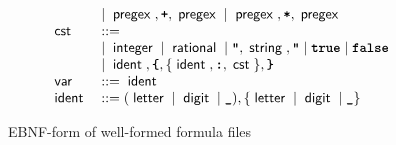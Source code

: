 \begin{figure}
\[\begin{array}{ll}
			                       & \mid \;\mathsf{pregex}\;, \texttt{\textbf{+}}, \;\mathsf{pregex}\; \mid \;\mathsf{pregex}\;, \texttt{\textbf{*}}, \;\mathsf{pregex}\;                                                                                 \\
			\;\mathsf{cst}\;            & ::=                                                                                                                                                                           \\
			                       & \mid \;\mathsf{integer}\; \mid \;\mathsf{rational}\; \mid \texttt{\textbf{"}}, \;\mathsf{string}\;, \texttt{\textbf{"}} \mid \texttt{\textbf{true}} \mid \texttt{\textbf{false}}                                                     \\
			                       & \mid \;\mathsf{ident}\;, \texttt{\textbf{\{}}, \{ \;\mathsf{ident}\;, \texttt{\textbf{:}}, \;\mathsf{cst}\; \}, \texttt{\textbf{\}}}                                                                                       \\
			\;\mathsf{var}\;            & ::= \;\mathsf{ident}\;                                                                                                                                                             \\
			\;\mathsf{ident}\;          & ::= (\;\mathsf{letter}\; \mid \;\mathsf{digit}\; \mid \texttt{\textbf{\_}}), \{ \;\mathsf{letter}\; \mid \;\mathsf{digit}\; \mid \texttt{\textbf{\_}} \}                                                              \\
		\end{array}
	\]
	\caption{EBNF-form of well-formed formula files}
	\label{fig:grammar_formula_syntax}
\end{figure}

